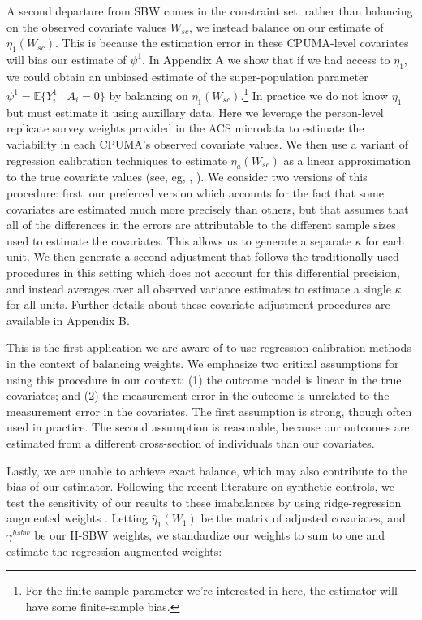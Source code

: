\documentclass[aoas]{imsart}
\theoremstyle{plain}
\theoremstyle{remark}
\begin{document}
A second departure from SBW comes in the constraint set: rather than balancing on the observed covariate values $W_{sc}$, we instead balance on our estimate of $\eta_1(W_{sc})$. This is because the estimation error in these CPUMA-level covariates will bias our estimate of $\psi^1$. In Appendix A we show that if we had access to $\eta_1$, we could obtain an unbiased estimate of the super-population parameter $\psi^1 = \mathbb{E}\{Y_i^1 \mid A_i = 0\}$ by balancing on $\eta_1(W_{sc})$.\footnote{For the finite-sample parameter we're interested in here, the estimator will have some finite-sample bias.} In practice we do not know $\eta_1$ but must estimate it using auxillary data. Here we leverage the person-level replicate survey weights provided in the ACS microdata to estimate the variability in each CPUMA's observed covariate values. We then use a variant of regression calibration techniques to estimate $\eta_a(W_{sc})$ as a linear approximation to the true covariate values (see, eg, \cite{gleser1992importance}, \cite{carroll2006measurement}). We consider two versions of this procedure: first, our preferred version which accounts for the fact that some covariates are estimated much more precisely than others, but that assumes that all of the differences in the errors are attributable to the different sample sizes used to estimate the covariates. This allows us to generate a separate $\kappa$ for each unit. We then generate a second adjustment that follows the traditionally used procedures in this setting which does not account for this differential precision, and instead averages over all observed variance estimates to estimate a single $\kappa$ for all units. Further details about these covariate adjustment procedures are available in Appendix B.

This is the first application we are aware of to use regression calibration methods in the context of balancing weights. We emphasize two critical assumptions for using this procedure in our context: (1) the outcome model is linear in the true covariates; and (2) the measurement error in the outcome is unrelated to the measurement error in the covariates. The first assumption is strong, though often used in practice. The second assumption is reasonable, because our outcomes are estimated from a different cross-section of individuals than our covariates. 

Lastly, we are unable to achieve exact balance, which may also contribute to the bias of our estimator. Following the recent literature on synthetic controls, we test the sensitivity of our results to these imabalances by using ridge-regression augmented weights \cite{ben2018augmented}. Letting $\hat{\eta}_1(W_1)$ be the matrix of adjusted covariates, and $\gamma^{hsbw}$ be our H-SBW weights, we standardize our weights to sum to one and estimate the regression-augmented weights:
\end{document}
